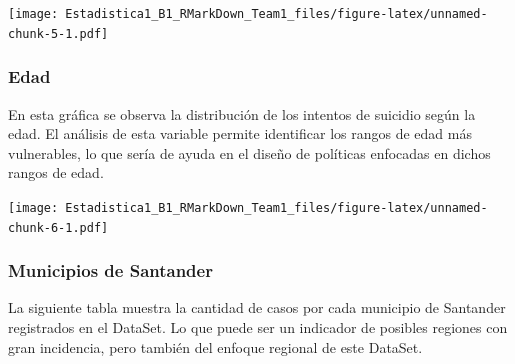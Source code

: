 \documentclass[
]{article}
\newenvironment{Shaded}{\begin{snugshade}}{\end{snugshade}}
\newcommand{\AttributeTok}[1]{\textcolor[rgb]{0.13,0.29,0.53}{#1}}
\newcommand{\ConstantTok}[1]{\textcolor[rgb]{0.56,0.35,0.01}{#1}}
\newcommand{\DecValTok}[1]{\textcolor[rgb]{0.00,0.00,0.81}{#1}}
\newcommand{\FunctionTok}[1]{\textcolor[rgb]{0.13,0.29,0.53}{\textbf{#1}}}
\newcommand{\NormalTok}[1]{#1}
\newcommand{\OtherTok}[1]{\textcolor[rgb]{0.56,0.35,0.01}{#1}}
\newcommand{\SpecialCharTok}[1]{\textcolor[rgb]{0.81,0.36,0.00}{\textbf{#1}}}
\newcommand{\StringTok}[1]{\textcolor[rgb]{0.31,0.60,0.02}{#1}}
\begin{document}
\texttt{[image: Estadistica1\_B1\_RMarkDown\_Team1\_files/figure-latex/unnamed-chunk-5-1.pdf]}

\subsubsection{Edad}\label{edad}

En esta gráfica se observa la distribución de los intentos de suicidio
según la edad. El análisis de esta variable permite identificar los
rangos de edad más vulnerables, lo que sería de ayuda en el diseño de
políticas enfocadas en dichos rangos de edad.

\begin{Shaded}
\end{Shaded}

\texttt{[image: Estadistica1\_B1\_RMarkDown\_Team1\_files/figure-latex/unnamed-chunk-6-1.pdf]}

\subsubsection{Municipios de Santander}\label{municipios-de-santander}

La siguiente tabla muestra la cantidad de casos por cada municipio de
Santander registrados en el DataSet. Lo que puede ser un indicador de
posibles regiones con gran incidencia, pero también del enfoque regional
de este DataSet.

\begin{Shaded}
\end{Shaded}
\end{document}
